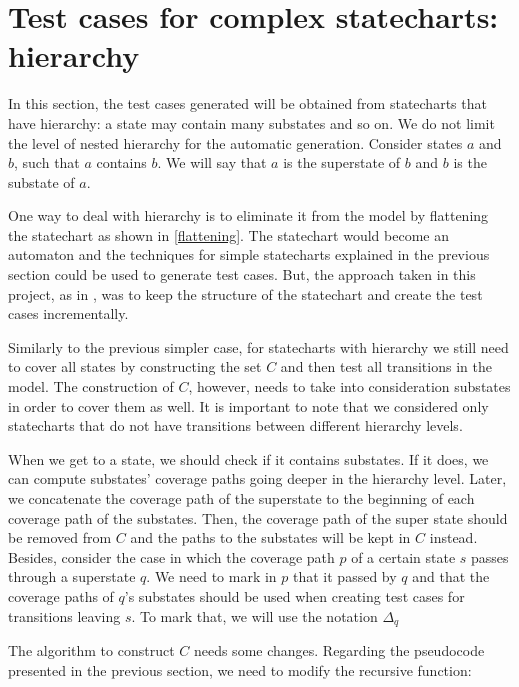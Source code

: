 \section{Test cases for complex statecharts: hierarchy}
\label{testHierarchy}

In this section, the test cases generated will be obtained from statecharts that have hierarchy: a state may contain many substates and so on. We do not limit the level of nested hierarchy for the automatic generation. Consider states $a$ and $b$, such that $a$ contains $b$. We will say that $a$ is the superstate of $b$ and $b$ is the substate of $a$.

One way to deal with hierarchy is to eliminate it from the model by flattening the statechart as shown in \ref{flattening}. The statechart would become an automaton and the techniques for simple statecharts explained in the previous section could be used to generate test cases. But, the approach taken in this project, as in \cite{bogdanov}, was to keep the structure of the statechart and create the test cases incrementally.

Similarly to the previous simpler case, for statecharts with hierarchy we still need to cover all states by constructing the set $C$ and then test all transitions in the model. The construction of $C$, however, needs to take into consideration substates in order to cover them as well. It is important to note that we considered only statecharts that do not have transitions between different hierarchy levels. 

When we get to a state, we should check if it contains substates. If it does, we can compute substates' coverage paths going deeper in the hierarchy level. Later, we concatenate the coverage path of the superstate to the beginning of each coverage path of the substates. Then, the coverage path of the super state should be removed from $C$ and the paths to the substates will be kept in $C$ instead. Besides, consider the case in which the coverage path $p$ of a certain state $s$ passes through a superstate $q$. We need to mark in $p$ that it passed by $q$ and that the coverage paths of $q$'s substates should be used when creating test cases for transitions leaving $s$. To mark that, we will use the notation $\Delta_q$

The algorithm to construct $C$ needs some changes. Regarding the pseudocode presented in the previous section, we need to modify the recursive function:

